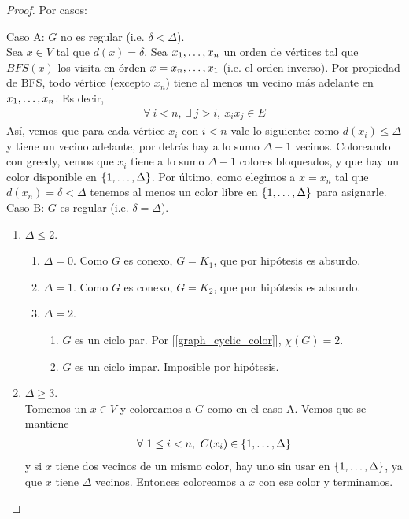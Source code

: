 \begin{proof}
Por casos:

Caso A: $G$ no es regular (i.e. $\delta < \Delta$).\\
Sea $x \in V$ tal que $d(x) = \delta$. Sea $x_1, \mathellipsis, x_n$ un orden de vértices tal que $BFS(x)$ los visita en órden $x = x_n, \mathellipsis, x_1$ (i.e. el orden inverso). Por propiedad de BFS, todo vértice (excepto $x_n$) tiene al menos un vecino más adelante en $x_1, \mathellipsis, x_n$. Es decir,
    \begin{align}
        \forall~ i < n,~ \exists~ j > i,~ x_ix_j \in E    
    \end{align}
Así, vemos que para cada vértice $x_i$ con $i < n$ vale lo siguiente: como $d(x_i) \le \Delta$ y tiene un vecino adelante, por detrás hay a lo sumo $\Delta - 1$ vecinos. Coloreando con greedy, vemos que $x_i$ tiene a lo sumo $\Delta - 1$ colores bloqueados, y que hay un color disponible en $\{1, \mathellipsis, \Delta\}$. Por último, como elegimos a $x = x_n$ tal que $d(x_n) = \delta < \Delta$ tenemos al menos un color libre en $\{1, \mathellipsis, \Delta\}$ para asignarle.\\

Caso B: $G$ es regular (i.e. $\delta = \Delta$).
\begin{enumerate}
    \item $\Delta \le 2$.
    \begin{enumerate}
        \item $\Delta = 0$. Como $G$ es conexo, $G = K_1$, que por hipótesis es absurdo.
        \item $\Delta = 1$. Como $G$ es conexo, $G = K_2$, que por hipótesis es absurdo.
        \item $\Delta = 2$.
        \begin{enumerate}
            \item $G$ es un ciclo par. Por [\ref{graph_cyclic_color}], $\chi(G) = 2$.
            \item $G$ es un ciclo impar. Imposible por hipótesis.
        \end{enumerate}
    \end{enumerate}

    \item $\Delta \ge 3$.\\
    Tomemos un $x \in V$ y coloreamos a $G$ como en el caso A. Vemos que se mantiene
    \begin{align}
        \forall~ 1 \le i < n,~ C(x_i) \in \{1, \mathellipsis, \Delta\}
    \end{align}
    y si $x$ tiene dos vecinos de un mismo color, hay uno sin usar en $\{1, \mathellipsis, \Delta\}$, ya que $x$ tiene $\Delta$ vecinos. Entonces coloreamos a $x$ con ese color y terminamos.


\end{enumerate}
\end{proof}
